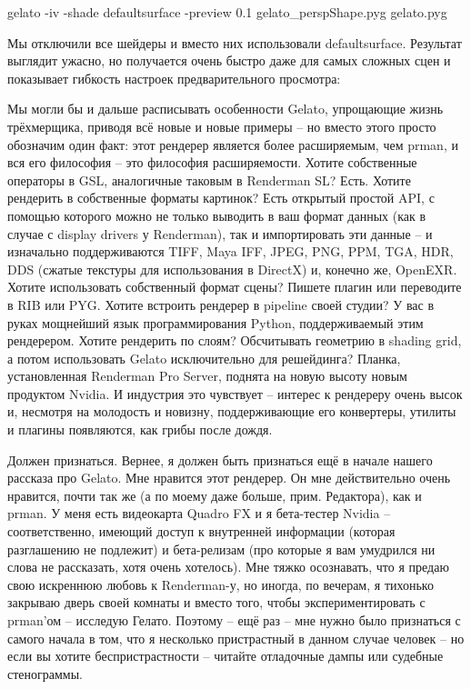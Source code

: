 gelato  -iv  -shade defaultsurface -preview 0.1 gelato\_perspShape.pyg gelato.pyg
  

 Мы отключили все шейдеры и вместо них использовали
    defaultsurface. Результат выглядит ужасно,  но получается очень быстро даже
    для самых сложных сцен и показывает гибкость настроек
    предварительного просмотра:
  

  

 Мы могли бы и дальше расписывать особенности
    Gelato, упрощающие жизнь трёхмерщика, приводя всё новые и новые
    примеры – но вместо этого просто обозначим один факт: этот рендерер
    является более расширяемым, чем prman, и вся его философия – это
    философия расширяемости. Хотите собственные операторы в GSL,
    аналогичные таковым в Renderman SL? Есть. Хотите рендерить в
    собственные форматы картинок? Есть открытый простой API, с помощью
    которого можно не только выводить в ваш формат данных (как в случае
    с display drivers у Renderman), так и импортировать эти данные – и
    изначально поддерживаются TIFF, Maya IFF, JPEG, PNG, PPM, TGA, HDR,
    DDS (сжатые текстуры для использования в DirectX) и, конечно же,
    OpenEXR. Хотите использовать собственный формат сцены? Пишете
    плагин или переводите в RIB или PYG. Хотите встроить рендерер в
    pipeline своей студии? У вас в руках мощнейший язык
    программирования Python, поддерживаемый этим рендерером. Хотите
    рендерить по слоям? Обсчитывать геометрию в shading grid, а потом
    использовать Gelato исключительно для решейдинга? Планка,
    установленная Renderman Pro Server,  поднята на новую высоту новым
    продуктом Nvidia. И индустрия это чувствует – интерес к рендереру
    очень высок и, несмотря на молодость и новизну, поддерживающие его
    конвертеры, утилиты и плагины появляются, как грибы после
    дождя.
  

 Должен признаться. Вернее, я должен быть признаться
    ещё в начале нашего рассказа про Gelato. Мне нравится этот
    рендерер. Он мне действительно очень нравится, почти так же (а по
    моему даже больше, прим. Редактора), как и prman. У меня есть
    видеокарта Quadro FX и я бета-тестер Nvidia – соответственно,
    имеющий доступ к внутренней информации (которая разглашению не
    подлежит) и бета-релизам (про которые я вам умудрился ни слова не
    рассказать, хотя очень хотелось). Мне тяжко осознавать, что я
    предаю свою искреннюю любовь к Renderman-у, но иногда, по вечерам,
    я тихонько закрываю дверь своей комнаты и вместо того, чтобы
    экспериментировать с prman’ом – исследую Гелато. Поэтому – ещё раз
    – мне нужно было признаться с самого начала в том, что я несколько
    пристрастный в данном случае человек – но если вы хотите
    беспристрастности – читайте отладочные дампы или судебные
    стенограммы.
  

